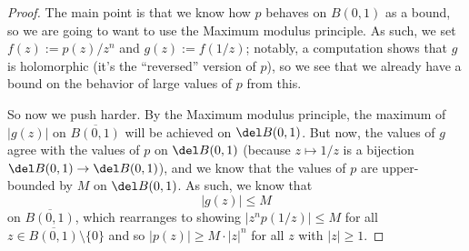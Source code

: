 \begin{proof}
	The main point is that we know how $p$ behaves on $B(0,1)$ as a bound, so we are going to want to use the Maximum modulus principle. As such, we set $f(z):=p(z)/z^n$ and $g(z):=f(1/z)$; notably, a computation shows that $g$ is holomorphic (it's the ``reversed'' version of $p$), so we see that we already have a bound on the behavior of large values of $p$ from this.

	So now we push harder. By the Maximum modulus principle, the maximum of $|g(z)|$ on $\overline{B(0,1)}$ will be achieved on $\del B(0,1)$. But now, the values of $g$ agree with the values of $p$ on $\del B(0,1)$ (because $z\mapsto1/z$ is a bijection $\del B(0,1)\to\del B(0,1)$), and we know that the values of $p$ are upper-bounded by $M$ on $\del B(0,1)$. As such, we know that
	\[|g(z)|\le M\]
	on $\overline{B(0,1)}$, which rearranges to showing $\left|z^np(1/z)\right|\le M$ for all $z\in\overline{B(0,1)}\setminus\{0\}$ and so $|p(z)|\ge M\cdot|z|^n$ for all $z$ with $|z|\ge1$.
\end{proof}

